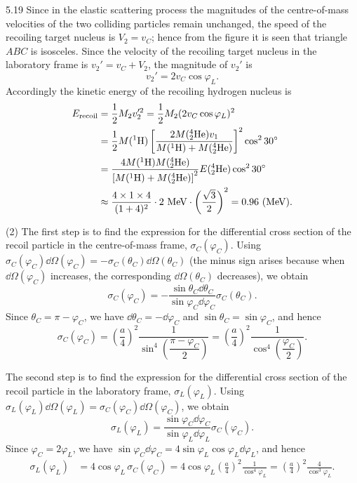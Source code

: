 \begin{solution}{5.19}
Since in the elastic scattering process the magnitudes of the centre-of-mass velocities of the two
colliding particles remain unchanged, the speed of the recoiling target nucleus is $V_2=v_C$;
hence from the figure it is seen that triangle $ABC$ is isosceles. Since the velocity of the
recoiling target nucleus in the laboratory frame is $v_2'=v_C+V_2$, the magnitude of $v_2'$ is
\begin{equation*}
v_2'=2v_C\cos\varphi_L.
\end{equation*}
Accordingly the kinetic energy of the recoiling hydrogen nucleus is
\begin{align*}
E_{\text{recoil}}&=\frac{1}{2}M_2v_2'^2=\frac{1}{2}M_2(2v_C\cos\varphi_L)^2\\
&=\frac{1}{2}M({}^{1}\mathrm{H})\left[\frac{2M({}^{4}_{2}\mathrm{He})v_1}
{M({}^{1}\mathrm{H})+M({}^{4}_{2}\mathrm{He})}\right]^2\cos^2 30\degree\\
&=\frac{4M({}^{1}\mathrm{H})M({}^{4}_{2}\mathrm{He})}
{\left[M({}^{1}\mathrm{H})+M({}^{4}_{2}\mathrm{He})\right]^2}E({}^{4}_{2}\mathrm{He})\cos^2 30\degree\\
&\approx\frac{4\times 1\times 4}{(1+4)^2}\cdot 2\ \mathrm{MeV}\cdot\left(\frac{\sqrt{3}}{2}\right)^2
=0.96\ (\mathrm{MeV}).
\end{align*}

(2) The first step is to find the expression for the differential cross section of the recoil
particle in the centre-of-mass frame, $\sigma_C(\varphi_C)$. Using
$\sigma_C(\varphi_C)\dd\Omega(\varphi_C)=-\sigma_C(\theta_C)\dd\Omega(\theta_C)$ (the minus sign
arises because when $\dd\Omega(\varphi_C)$ increases, the corresponding $\dd\Omega(\theta_C)$
decreases), we obtain
\begin{equation*}
\sigma_C(\varphi_C)=-\frac{\sin\theta_C\dd\theta_C}{\sin\varphi_C\dd\varphi_C}\sigma_C(\theta_C).
\end{equation*}
Since $\theta_C=\pi-\varphi_C$, we have $\dd\theta_C=-\dd\varphi_C$ and $\sin\theta_C=\sin\varphi_C$,
and hence
\begin{equation*}
\sigma_C(\varphi_C)=\left(\frac{a}{4}\right)^2\frac{1}{\sin^4\left(\dfrac{\pi-\varphi_C}{2}\right)}
=\left(\frac{a}{4}\right)^2\frac{1}{\cos^4\left(\dfrac{\varphi_C}{2}\right)}.
\end{equation*}

The second step is to find the expression for the differential cross section of the recoil
particle in the laboratory frame, $\sigma_L(\varphi_L)$. Using
$\sigma_L(\varphi_L)\dd\Omega(\varphi_L)=\sigma_C(\varphi_C)\dd\Omega(\varphi_C)$, we obtain
\begin{equation*}
\sigma_L(\varphi_L)=\frac{\sin\varphi_C\dd\varphi_C}{\sin\varphi_L\dd\varphi_L}\sigma_C(\varphi_C).
\end{equation*}
Since $\varphi_C=2\varphi_L$, we have
$\sin\varphi_C\dd\varphi_C=4\sin\varphi_L\cos\varphi_L\dd\varphi_L$, and hence
\begin{align*}
\sigma_L(\varphi_L)&=4\cos\varphi_L\,\sigma_C(\varphi_C)
=4\cos\varphi_L\left(\frac{a}{4}\right)^2\frac{1}{\cos^4\varphi_L}
=\left(\frac{a}{4}\right)^2\frac{4}{\cos^3\varphi_L}.
\end{align*}


\end{solution}
